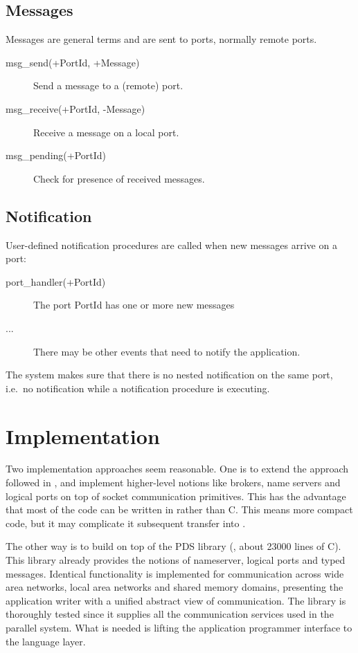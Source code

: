 \subsection{Messages}
Messages are general \eclipse terms and are sent to ports, normally
remote ports.
\begin{description}
\item [msg\_send(+PortId, +Message)] Send a message to a (remote) port.
\item [msg\_receive(+PortId, -Message)] Receive a message on a local port.
\item [msg\_pending(+PortId)] Check for presence of received messages.
\end{description}

\subsection{Notification}
User-defined notification procedures are called when new messages
arrive on a port:
\begin{description}
\item [port\_handler(+PortId)] The port PortId has one or more new messages
\item [...] There may be other events that need to notify the application.
\end{description}
The system makes sure that there is no nested notification on the same port,
i.e.\ no notification while a notification procedure is executing.


\section{Implementation}

Two implementation approaches seem reasonable.
One is to extend the approach followed in \cite{pitt}, \cite{vass} and
implement higher-level notions like brokers, name servers and logical ports
on top of \eclipse socket communication primitives.
This has the advantage that most of the code can be written in
\eclipse rather than C. This means more compact code, but it may
complicate it subsequent transfer into \eclipsetwo.

The other way is to build on top of the PDS library (\cite{kees},
about 23000 lines of C).
This library already provides the notions of nameserver, logical ports
and typed messages.
Identical functionality is implemented for communication across
wide area networks, local area networks and shared memory domains,
presenting the application writer with a unified abstract view of
communication.
The library is thoroughly tested since it supplies all the
communication services used in the parallel \eclipse system.
What is needed is lifting the application programmer interface to the \eclipse
language layer.


